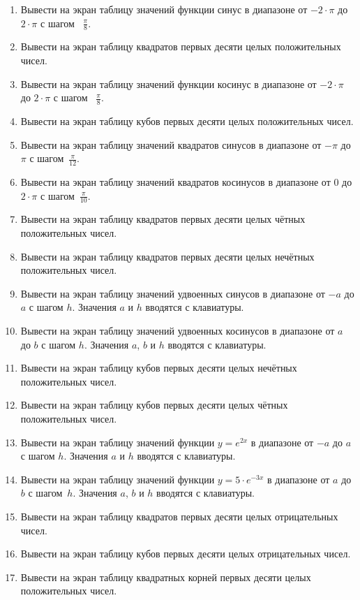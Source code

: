 \begin{enumerate}
\item Вывести на экран таблицу значений функции синус в диапазоне от  $-2\cdot \pi $ до  $2\cdot \pi $  с шагом~
$\frac{\pi}{8}$.
\item Вывести на экран таблицу квадратов первых десяти целых положительных чисел.
\item Вывести на экран таблицу значений функции косинус в диапазоне от  $-2\cdot \pi $  до  $2\cdot \pi $  с шагом~
$\frac{\pi}{8}$.
\item Вывести на экран таблицу кубов первых десяти целых положительных чисел.
\item Вывести на экран таблицу значений квадратов синусов в диапазоне от  $-\pi$  до  $\pi$  с шагом~$\frac{\pi}{12}$.
\item Вывести на экран таблицу значений квадратов косинусов в диапазоне от 0 до $2\cdot \pi$ с шагом~$\frac{\pi}{10}$.
\item Вывести на экран таблицу квадратов первых десяти целых чётных положительных чисел.
\item Вывести на экран таблицу квадратов первых десяти целых нечётных положительных чисел.
\item Вывести на экран таблицу значений удвоенных синусов в диапазоне от $-a$ до $a$ с шагом $h$. Значения $a$ и
 $h$  вводятся с клавиатуры.
\item Вывести на экран таблицу значений удвоенных косинусов в диапазоне от  $a$  до  $b$  с шагом  $h$. Значения  $a$,
 $b$  и  $h$  вводятся с клавиатуры.
\item Вывести на экран таблицу кубов первых десяти целых нечётных положительных чисел.
\item Вывести на экран таблицу кубов первых десяти целых чётных положительных чисел.
\item Вывести на экран таблицу значений функции  $y=e^{2x}$ в диапазоне от  $-a$  до  $a$  с шагом  $h$. Значения  $a$ 
и  $h$  вводятся с клавиатуры.
\item Вывести на экран таблицу значений функции  $y=5\cdot e^{-3x}$  в диапазоне от  $a$  до  $b$  с шагом~$h$.
Значения  $a$,  $b$  и  $h$  вводятся с клавиатуры.
\item Вывести на экран таблицу квадратов первых десяти целых отрицательных чисел.
\item Вывести на экран таблицу кубов первых десяти целых отрицательных чисел.
\item Вывести на экран таблицу квадратных корней первых десяти целых положительных чисел.

\end{enumerate}
